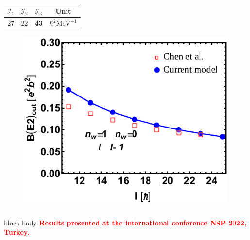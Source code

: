 \documentclass{beamer}
\begin{document}
\begin{frame}
\begin{columns}
\begin{column}{0.4\textwidth}
\begin{table}
{\begin{tabular}{cccc}
				\multicolumn{1}{c}{$\mathcal{I}_1$} & \multicolumn{1}{c}{$\mathcal{I}_2$} & \multicolumn{1}{c}{$\mathcal{I}_3$} & \multicolumn{1}{c}{Unit}                     \\ \hline
				\multicolumn{1}{c}{27}              & \multicolumn{1}{c}{22}              & \multicolumn{1}{c}{\textbf{43}}              & \multicolumn{1}{c}{$\hbar^2\text{MeV}^{-1}$} \\ \hline
				\end{tabular}%
				}
				\label{table-params-ba130}
			\end{table}
			\begin{figure}
				\centering
				\includegraphics[width=0.99\textwidth]{figures/ba130-EM.pdf}
			\end{figure}
		\end{column}
	\end{columns}
	
			
	\begin{beamercolorbox}[rounded=true,shadow=false, wd=\linewidth,]{block body}
		\centering
		\textcolor{red}{\footnotesize\textbf{Results presented at the international conference NSP-2022, Turkey.}}
	\end{beamercolorbox}
\end{frame}
\end{document}
